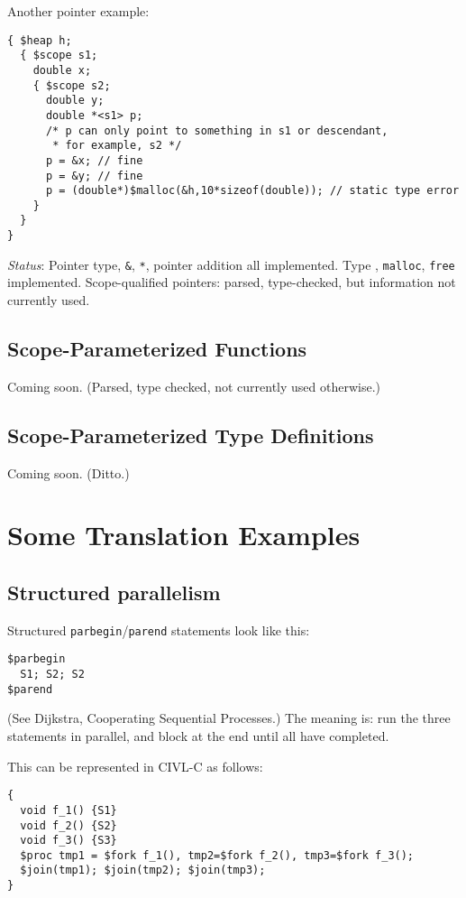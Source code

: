 \documentclass[11pt]{book}
\begin{document}
Another pointer example:
\begin{verbatim}
{ $heap h;
  { $scope s1;
    double x;
    { $scope s2;
      double y;
      double *<s1> p;
      /* p can only point to something in s1 or descendant,
       * for example, s2 */
      p = &x; // fine
      p = &y; // fine
      p = (double*)$malloc(&h,10*sizeof(double)); // static type error
    }
  }
}
\end{verbatim}

\emph{Status}: Pointer type, \texttt{\&}, \texttt{*}, pointer addition
all implemented.  Type \cheap{}, \texttt{malloc}, \texttt{free}
implemented.  Scope-qualified pointers: parsed, type-checked, but
information not currently used.

\section{Scope-Parameterized Functions}

Coming soon.  (Parsed, type checked, not currently used otherwise.)

\section{Scope-Parameterized Type Definitions}

Coming soon. (Ditto.)

\chapter{Some Translation Examples}

\section{Structured parallelism}
Structured \verb!parbegin!/\verb!parend! statements look like this:
\begin{verbatim}
$parbegin
  S1; S2; S2
$parend
\end{verbatim}
(See Dijkstra, Cooperating Sequential Processes.)  The meaning is: run
the three statements in parallel, and block at the end until all have
completed.

This can be represented in CIVL-C as follows:

\begin{verbatim}
{
  void f_1() {S1}
  void f_2() {S2}
  void f_3() {S3}
  $proc tmp1 = $fork f_1(), tmp2=$fork f_2(), tmp3=$fork f_3();
  $join(tmp1); $join(tmp2); $join(tmp3);
}
\end{verbatim}
\end{document}
